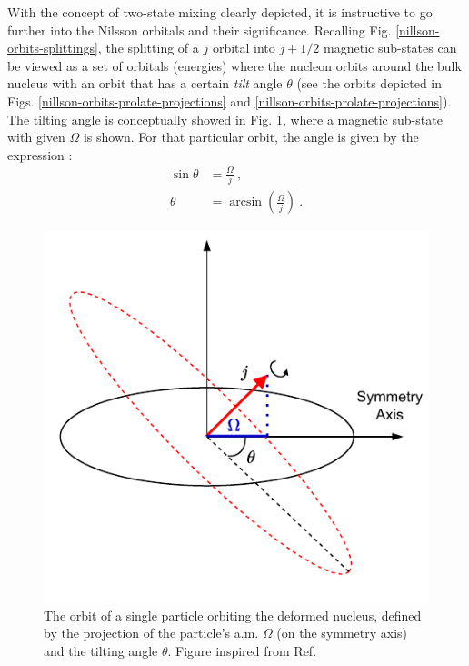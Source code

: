 With the concept of two-state mixing clearly depicted, it is instructive to go further into the Nilsson orbitals and their significance. Recalling Fig. \ref{nillson-orbits-splittings}, the splitting of a $j$ orbital into $j+1/2$ magnetic sub-states can be viewed as a set of orbitals (energies) where the nucleon orbits around the bulk nucleus with an orbit that has a certain \emph{tilt} angle $\theta$ (see the orbits depicted in Figs. \ref{nillson-orbits-prolate-projections} and \ref{nillson-orbits-prolate-projections}). The tilting angle is conceptually showed in Fig. \ref{fig-nilsson-tilting-angle}, where a magnetic sub-state with given $\Omega$ is shown. For that particular orbit, the angle is given by the expression \cite{krane1991introductory,casten2000nuclear}:
\begin{align}
    \sin\theta&=\frac{\Omega}{j}\ , \nonumber\\
    \theta&=\arcsin(\frac{\Omega}{j})\ .
\end{align}
\begin{figure}
    \centering
    \includegraphics[scale=0.95]{Chapters/Figures/nilsson_tilting_angle.pdf}
    \caption{The orbit of a single particle orbiting the deformed nucleus, defined by the projection of the particle's a.m. $\Omega$ (on the symmetry axis) and the tilting angle $\theta$. Figure inspired from Ref. \cite{casten2000nuclear}}
    \label{fig-nilsson-tilting-angle}
\end{figure}

